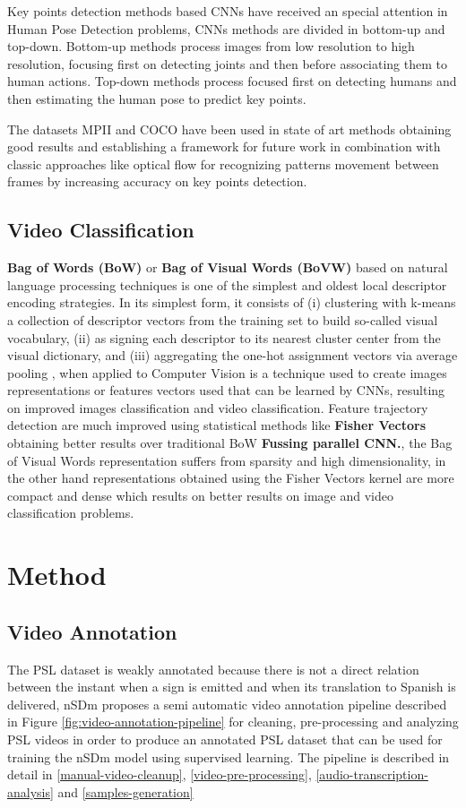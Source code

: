 \documentclass[twocolumn,conference]{article}
\begin{document}
Key points detection methods based CNNs have received an special attention in Human Pose Detection problems, CNNs methods are divided in bottom-up and top-down. Bottom-up methods process images from low resolution  to high resolution, focusing first on detecting joints and then before associating them to human actions. Top-down methods process focused first on detecting humans and then estimating the human pose to predict key points. 

The datasets MPII and COCO have been used in state of art methods obtaining good results\cite{XiaoWuWeiSimpleBaseline} and establishing a framework for future work in combination with classic approaches like optical flow for recognizing patterns movement between frames by increasing accuracy on key points detection.
\subsection{Video Classification}
\textbf{Bag of Words (BoW)} or \textbf{Bag of Visual Words (BoVW)} based on natural language processing techniques is one of the simplest and oldest local descriptor encoding strategies. In its simplest form, it consists of (i) clustering with k-means a collection of descriptor vectors from the training set to build so-called visual vocabulary, (ii) as signing each descriptor to its nearest cluster center from the visual dictionary, and (iii) aggregating the one-hot assignment vectors via average pooling \cite{wang2019hallucinating}, when applied to Computer Vision is a technique used to create images representations or features vectors used that can be learned by CNNs, resulting on improved images classification and video classification. 
Feature trajectory detection are much improved using statistical methods like \textbf{Fisher Vectors} obtaining better results over traditional BoW \textbf{Fussing parallel CNN.}, the Bag of Visual Words representation suffers from sparsity and high dimensionality, in the other hand representations obtained using the Fisher Vectors kernel are more compact and dense which results on better results on image and video classification problems.
\section{Method}\label{method}
\subsection{Video Annotation}\label{videoannot}
The PSL dataset is weakly annotated because there is not a direct relation between the instant when a sign is emitted and when its translation to Spanish is delivered, nSDm proposes a semi automatic video annotation pipeline described in Figure \ref{fig:video-annotation-pipeline} for cleaning, pre-processing and analyzing PSL videos in order to produce an annotated PSL dataset that can be used for training the nSDm model using supervised learning. The pipeline is described in detail in \ref{manual-video-cleanup}, \ref{video-pre-processing}, \ref{audio-transcription-analysis} and \ref{samples-generation}
\end{document}

